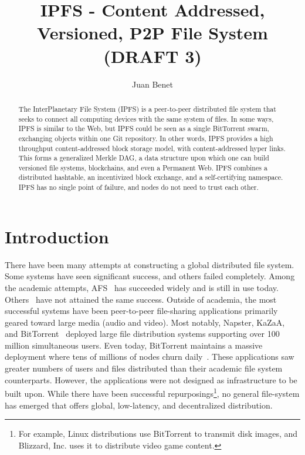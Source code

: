 \documentclass{sig-alternate}
\begin{document}
\title{IPFS - Content Addressed, Versioned, P2P File System (DRAFT 3)}
\subtitle{}


\author{
\alignauthor
  Juan Benet\\
}

\maketitle
\begin{abstract}
The InterPlanetary File System (IPFS) is a peer-to-peer distributed file system that seeks to connect all computing devices with the same system of files. In some ways, IPFS is similar to the Web, but IPFS could be seen as a single BitTorrent swarm, exchanging objects within one Git repository. In other words, IPFS provides a high throughput content-addressed block storage model, with content-addressed hyper links. This forms a generalized Merkle DAG, a data structure upon which one can build versioned file systems, blockchains, and even a Permanent Web. IPFS combines a distributed hashtable, an incentivized block exchange, and a self-certifying namespace. IPFS has no single point of failure, and nodes do not need to trust each other.
\end{abstract}

\section{Introduction}

There have been many attempts at constructing a global distributed file system. Some systems have seen significant success, and others failed completely. Among the academic attempts, AFS~\cite{AFS} has succeeded widely and is still in use today. Others~\cite{Oceanstore, CFS} have not attained the same success. Outside of academia, the most successful systems have been peer-to-peer file-sharing applications primarily geared toward large media (audio and video). Most notably, Napster, KaZaA, and BitTorrent~\cite{BitTorrentUsers} deployed large file distribution systems supporting over 100 million simultaneous users. Even today, BitTorrent maintains a massive deployment where tens of millions of nodes churn daily~\cite{wang13}. These applications saw greater numbers of users and files distributed than their academic file system counterparts. However, the applications were not designed as infrastructure to be built upon. While there have been successful repurposings\footnote{For example, Linux distributions use BitTorrent to transmit disk images, and  Blizzard, Inc. uses it to distribute video game content.}, no general file-system has emerged that offers global, low-latency, and decentralized distribution.
\end{document}
